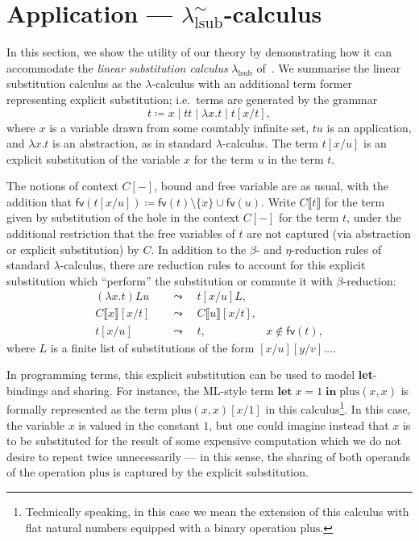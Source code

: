 \section{Application --- $\lambda^\sim_{\text{lsub}}$-calculus}
\label{sec:application}

In this section, we show the utility of our theory by demonstrating how it can accommodate the \emph{linear substitution calculus} $\lambda_{\text{lsub}}$ of~\citet[§ 2]{accattoli2014nonstandard}.
We summarise the linear substitution calculus as the $\lambda$-calculus with an additional term former representing explicit substitution; i.e.\ terms are generated by the grammar
\[
	t \coloneqq x \mid t t \mid \lambda x. t \mid t [x/t],
\]
where $x$ is a variable drawn from some countably infinite set, $t u$ is an application, and $\lambda x. t$ is an abstraction, as in standard $\lambda$-calculus.
The term $t [x / u]$ is an explicit substitution of the variable $x$ for the term $u$ in the term $t$.

The notions of context $C[-]$, bound and free variable are as usual, with the addition that $\textsf{fv} (t [x/u]) \coloneq \textsf{fv} (t) \setminus \{ x \} \cup \textsf{fv} (u)$.
Write $C \llbracket t \rrbracket$ for the term given by substitution of the hole in the context $C[-]$ for the term $t$, under the additional restriction that the free variables of $t$ are not captured (via abstraction or explicit substitution) by $C$.
In addition to the $\beta$- and $\eta$-reduction rules of standard $\lambda$-calculus, there are reduction rules to account for this explicit substitution which \enquote{perform} the substitution or commute it with $\beta$-reduction:
\begin{align*}
	(\lambda x. t) L u              \quad & \leadsto \quad t[x/u] L,                                                    \\
	C \llbracket x \rrbracket [x/t] \quad & \leadsto \quad C \llbracket u \rrbracket [x/t],                             \\
	t [x/u]                         \quad & \leadsto \quad t,                               & x \notin \textsf{fv} (t),
\end{align*}
where $L$ is a finite list of substitutions of the form $[x/u] [y/v] \ldots$.

In programming terms, this explicit substitution can be used to model \textbf{let}-bindings and sharing.
For instance, the ML-style term $\textbf{let} \; x = 1 \; \textbf{in} \; \text{plus} (x, x)$ is formally represented as the term $\text{plus} (x, x) [x / 1]$ in this calculus\footnote{Technically speaking, in this case we mean the extension of this calculus with flat natural numbers equipped with a binary operation $\text{plus}$.}.
In this case, the variable $x$ is valued in the constant $1$, but one could imagine instead that $x$ is to be substituted for the result of some expensive computation which we do not desire to repeat twice unnecessarily --- in this sense, the sharing of both operands of the operation $\text{plus}$ is captured by the explicit substitution.

